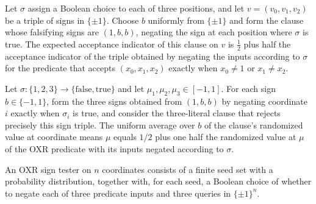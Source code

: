 \begin{theorem}
\label{FABL.expect_oxrE3SatReplacementClauses}
\leanok
{}
Let $\sigma$ assign a Boolean choice to each of three positions, and let
$v=(v_0,v_1,v_2)$ be a triple of signs in $\{\pm1\}$. Choose $b$ uniformly from
$\{\pm1\}$ and form the clause whose falsifying signs are $(1,b,b)$, negating the sign
at each position where $\sigma$ is true. The expected acceptance indicator of this
clause on $v$ is $\frac12$ plus half the acceptance indicator of the triple obtained by
negating the inputs according to $\sigma$ for the predicate that accepts $(x_0,x_1,x_2)$
exactly when $x_0\ne 1$ or $x_1\ne x_2$.
\end{theorem}

\begin{theorem}
\label{FABL.expect_oxrE3SatClause_randomizedValue}
\leanok
{}
Let $\sigma:\{1,2,3\}\to\{\mathrm{false},\mathrm{true}\}$ and let
$\mu_1,\mu_2,\mu_3\in[-1,1]$. For each sign $b\in\{−1,1\}$, form the three signs
obtained from $(1,b,b)$ by negating coordinate $i$ exactly when $\sigma_i$ is true, and
consider the three-literal clause that rejects precisely this sign triple. The uniform
average over $b$ of the clause's randomized value at coordinate means $\mu$ equals $1/2$
plus one half the randomized value at $\mu$ of the OXR predicate with its inputs negated
according to $\sigma$.
\end{theorem}

\begin{definition}
\label{FABL.OXRSignTester}
\leanok
An OXR sign tester on $n$ coordinates consists of a finite seed set with a probability
distribution, together with, for each seed, a Boolean choice of whether to negate each
of three predicate inputs and three queries in $\{\pm1\}^n$.
\end{definition}

